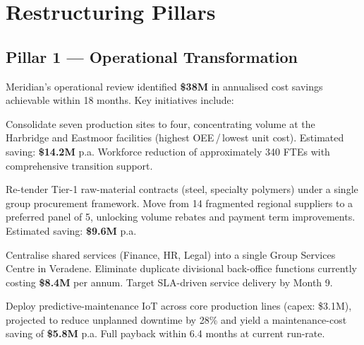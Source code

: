 \documentclass[11pt,a4paper]{article}
\begin{document}
\vspace{10pt}

\section{Restructuring Pillars}

\subsection{Pillar 1 — Operational Transformation}

Meridian's operational review identified \textbf{\$38M} in annualised cost savings achievable
within 18 months. Key initiatives include:

\vspace{6pt}
\noindent
\begin{minipage}[t]{0.48\textwidth}
  \begin{tcolorbox}[execbox={Manufacturing Footprint}]
    \footnotesize
    Consolidate seven production sites to four, concentrating volume at the Harbridge
    and Eastmoor facilities (highest OEE\,/\,lowest unit cost). Estimated saving:
    \textbf{\$14.2M} p.a. Workforce reduction of approximately 340 FTEs with comprehensive
    transition support.
  \end{tcolorbox}
\end{minipage}\hfill
\begin{minipage}[t]{0.48\textwidth}
  \begin{tcolorbox}[execbox={Supply-Chain Consolidation}]
    \footnotesize
    Re-tender Tier-1 raw-material contracts (steel, specialty polymers) under a single
    group procurement framework. Move from 14 fragmented regional suppliers to a
    preferred panel of 5, unlocking volume rebates and payment term improvements.
    Estimated saving: \textbf{\$9.6M} p.a.
  \end{tcolorbox}
\end{minipage}

\vspace{8pt}
\noindent
\begin{minipage}[t]{0.48\textwidth}
  \begin{tcolorbox}[execbox={Overhead Rationalisation}]
    \footnotesize
    Centralise shared services (Finance, HR, Legal) into a single Group Services Centre
    in Veradene. Eliminate duplicate divisional back-office functions currently costing
    \textbf{\$8.4M} per annum. Target SLA-driven service delivery by Month 9.
  \end{tcolorbox}
\end{minipage}\hfill
\begin{minipage}[t]{0.48\textwidth}
  \begin{tcolorbox}[execbox={Digital \& Automation}]
    \footnotesize
    Deploy predictive-maintenance IoT across core production lines (capex: \$3.1M),
    projected to reduce unplanned downtime by 28\% and yield a maintenance-cost
    saving of \textbf{\$5.8M} p.a. Full payback within 6.4 months at current run-rate.
  \end{tcolorbox}
\end{minipage}
\end{document}
